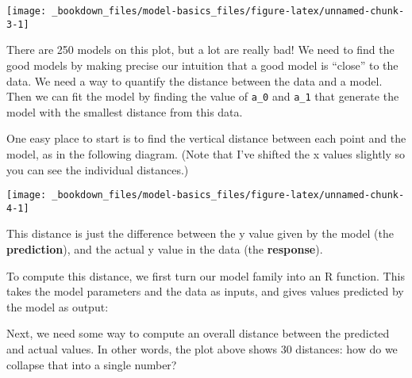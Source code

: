 \documentclass[]{book}
\newenvironment{Shaded}{\begin{snugshade}}{\end{snugshade}}
\newcommand{\KeywordTok}[1]{\textcolor[rgb]{0.13,0.29,0.53}{\textbf{{#1}}}}
\newcommand{\DecValTok}[1]{\textcolor[rgb]{0.00,0.00,0.81}{{#1}}}
\newcommand{\FloatTok}[1]{\textcolor[rgb]{0.00,0.00,0.81}{{#1}}}
\newcommand{\StringTok}[1]{\textcolor[rgb]{0.31,0.60,0.02}{{#1}}}
\newcommand{\CommentTok}[1]{\textcolor[rgb]{0.56,0.35,0.01}{\textit{{#1}}}}
\newcommand{\NormalTok}[1]{{#1}}
\begin{document}
\begin{center}\texttt{[image: \_bookdown\_files/model-basics\_files/figure-latex/unnamed-chunk-3-1]} \end{center}

There are 250 models on this plot, but a lot are really bad! We need to
find the good models by making precise our intuition that a good model
is ``close'' to the data. We need a way to quantify the distance between
the data and a model. Then we can fit the model by finding the value of
\texttt{a\_0} and \texttt{a\_1} that generate the model with the
smallest distance from this data.

One easy place to start is to find the vertical distance between each
point and the model, as in the following diagram. (Note that I've
shifted the x values slightly so you can see the individual distances.)

\begin{center}\texttt{[image: \_bookdown\_files/model-basics\_files/figure-latex/unnamed-chunk-4-1]} \end{center}

This distance is just the difference between the y value given by the
model (the \textbf{prediction}), and the actual y value in the data (the
\textbf{response}).

To compute this distance, we first turn our model family into an R
function. This takes the model parameters and the data as inputs, and
gives values predicted by the model as output:

\begin{Shaded}
\end{Shaded}

Next, we need some way to compute an overall distance between the
predicted and actual values. In other words, the plot above shows 30
distances: how do we collapse that into a single number?
\end{document}
